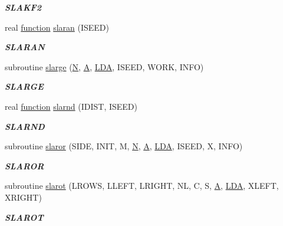 \begin{DoxyCompactItemize}
\begin{DoxyCompactList}\small\item\em {\bfseries S\+L\+A\+K\+F2} \end{DoxyCompactList}\item 
real \hyperlink{afunc_8m_a7b5e596df91eadea6c537c0825e894a7}{function} \hyperlink{group__real__matgen_ga7306778b5c8bc3590e83b806c9a57f1b}{slaran} (I\+S\+E\+E\+D)
\begin{DoxyCompactList}\small\item\em {\bfseries S\+L\+A\+R\+A\+N} \end{DoxyCompactList}\item 
subroutine \hyperlink{group__real__matgen_gae419dd66be405e47404d542eaa5e7f38}{slarge} (\hyperlink{polmisc_8c_a0240ac851181b84ac374872dc5434ee4}{N}, \hyperlink{classA}{A}, \hyperlink{example__user_8c_ae946da542ce0db94dced19b2ecefd1aa}{L\+D\+A}, I\+S\+E\+E\+D, W\+O\+R\+K, I\+N\+F\+O)
\begin{DoxyCompactList}\small\item\em {\bfseries S\+L\+A\+R\+G\+E} \end{DoxyCompactList}\item 
real \hyperlink{afunc_8m_a7b5e596df91eadea6c537c0825e894a7}{function} \hyperlink{group__real__matgen_ga8e2f5b9ec00d7322280f3029242aadec}{slarnd} (I\+D\+I\+S\+T, I\+S\+E\+E\+D)
\begin{DoxyCompactList}\small\item\em {\bfseries S\+L\+A\+R\+N\+D} \end{DoxyCompactList}\item 
subroutine \hyperlink{group__real__matgen_ga2e51dc8345db05a4d5f932416758a3f1}{slaror} (S\+I\+D\+E, I\+N\+I\+T, M, \hyperlink{polmisc_8c_a0240ac851181b84ac374872dc5434ee4}{N}, \hyperlink{classA}{A}, \hyperlink{example__user_8c_ae946da542ce0db94dced19b2ecefd1aa}{L\+D\+A}, I\+S\+E\+E\+D, X, I\+N\+F\+O)
\begin{DoxyCompactList}\small\item\em {\bfseries S\+L\+A\+R\+O\+R} \end{DoxyCompactList}\item 
subroutine \hyperlink{group__real__matgen_ga5125c93e3ebd59271ad3c5e014e07eae}{slarot} (L\+R\+O\+W\+S, L\+L\+E\+F\+T, L\+R\+I\+G\+H\+T, N\+L, C, S, \hyperlink{classA}{A}, \hyperlink{example__user_8c_ae946da542ce0db94dced19b2ecefd1aa}{L\+D\+A}, X\+L\+E\+F\+T, X\+R\+I\+G\+H\+T)
\begin{DoxyCompactList}\small\item\em {\bfseries S\+L\+A\+R\+O\+T} \end{DoxyCompactList}\item 

\end{DoxyCompactItemize}
